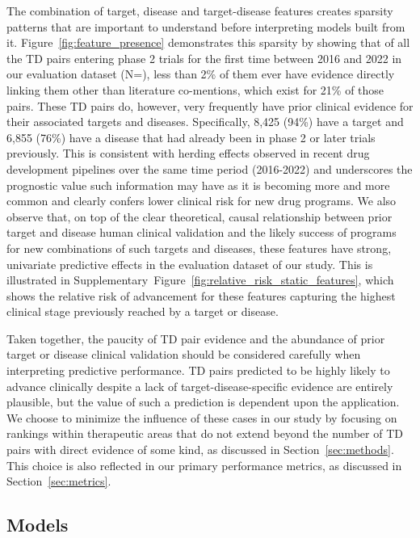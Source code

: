 \documentclass{article}
\begin{document}
The combination of target, disease and target-disease features creates sparsity patterns that are important to understand before interpreting models built from it. Figure~\ref{fig:feature_presence} demonstrates this sparsity by showing that of all the TD pairs entering phase 2 trials for the first time between 2016 and 2022 in our evaluation dataset (N=\evaluationDatasetPairCount), less than 2\% of them ever have evidence directly linking them other than literature co-mentions, which exist for 21\% of those pairs. These TD pairs do, however, very frequently have prior clinical evidence for their associated targets and diseases. Specifically, 8,425 (94\%) have a target and 6,855 (76\%) have a disease that had already been in phase 2 or later trials previously. This is consistent with herding effects observed in recent drug development pipelines \cite{PMID:37117303} over the same time period (2016-2022) and underscores the prognostic value such information may have as it is becoming more and more common and clearly confers lower clinical risk for new drug programs. We also observe that, on top of the clear theoretical, causal relationship between prior target and disease human clinical validation and the likely success of programs for new combinations of such targets and diseases, these features have strong, univariate predictive effects in the evaluation dataset of our study. This is illustrated in Supplementary~Figure~\ref{fig:relative_risk_static_features}, which shows the relative risk of advancement for these features capturing the highest clinical stage previously reached by a target or disease.

Taken together, the paucity of TD pair evidence and the abundance of prior target or disease clinical validation should be considered carefully when interpreting predictive performance. TD pairs predicted to be highly likely to advance clinically despite a lack of target-disease-specific evidence are entirely plausible, but the value of such a prediction is dependent upon the application. We choose to minimize the influence of these cases in our study by focusing on rankings within therapeutic areas that do not extend beyond the number of TD pairs with direct evidence of some kind, as discussed in Section~\ref{sec:methods}. This choice is also reflected in our primary performance metrics, as discussed in Section~\ref{sec:metrics}.

\subsection{Models}
\label{sec:models}
\end{document}
